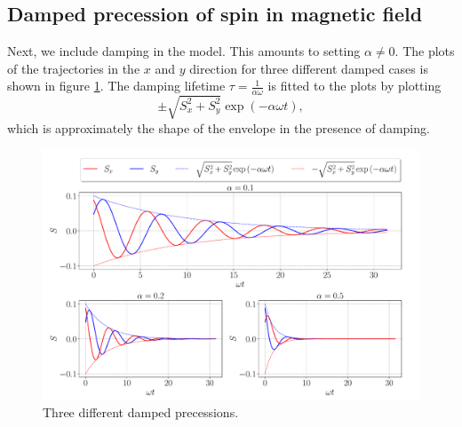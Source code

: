 \subsection{Damped precession of spin in magnetic field}

Next, we include damping in the model. This amounts to setting $\alpha \neq 0$. The plots of the trajectories in the $x$ and $y$ direction for three different damped cases is shown in figure \ref{fig:damped}. The damping lifetime $\tau =  \frac{1}{\alpha \omega}$ is fitted to the plots by plotting 
\[
	\pm \sqrt{S_x^2 + S_y^2} \exp{\left(-\alpha \omega t\right)},
\]
which is approximately the shape of the envelope in the presence of damping.  

\begin{figure}[htb]
	\centering
	\includegraphics[width=\columnwidth]{../fig/damped_precession.pdf}
	\caption{Three different damped precessions.}
	\label{fig:damped}
\end{figure}